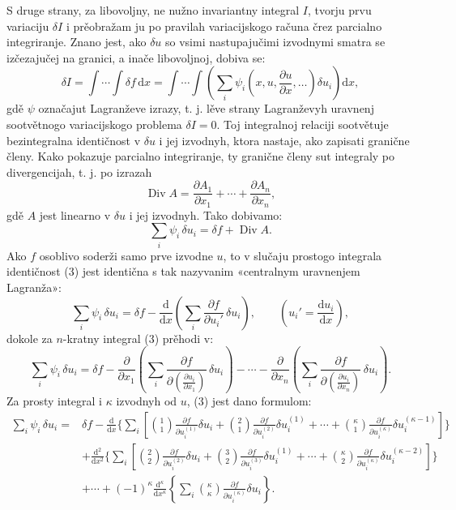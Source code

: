 \documentclass[11pt]{article}
\providecommand{\p}{\partial}
\providecommand{\dd}{\mathrm d}
\DeclareMathOperator{\Div}{Div}
\begin{document}
S druge strany, za libovoljny, ne nužno invariantny integral \(I\), tvorju prvu variaciju \(\delta I\) i prěobražam ju po pravilah variacijskogo računa črez parcialno integriranje. Znano jest, ako \(\delta u\) so vsimi nastupajučimi izvodnymi smatra se izčezajučej na granici, a inače libovoljnoj, dobiva se:
\begin{equation}
\delta I=\int\!\cdots\!\int \delta f\,\dd x
=\int\!\cdots\!\int\left(\sum_i\psi_i\!\left(x,u,\frac{\p u}{\p x},\ldots\right)\delta u_i\right)\dd x,
\tag{2}
\end{equation}
gdě \(\psi\) označajut Lagranževe izrazy, t. j. lěve strany Lagranževyh uravnenj sootvětnogo variacijskogo problema \(\delta I=0\). Toj integralnoj relaciji sootvětuje bezintegralna identičnost v \(\delta u\) i jej izvodnyh, ktora nastaje, ako zapisati granične členy. Kako pokazuje parcialno integriranje, ty granične členy sut integraly po divergencijah, t. j. po izrazah
\[
\Div A=\frac{\p A_1}{\p x_1}+\cdots+\frac{\p A_n}{\p x_n},
\]
gdě \(A\) jest linearno v \(\delta u\) i jej izvodnyh. Tako dobivamo:
\begin{equation}
\sum_i\psi_i\,\delta u_i=\delta f+\Div A.
\tag{3}
\end{equation}
Ako \(f\) osoblivo soderži samo prve izvodne \(u\), to v slučaju prostogo integrala identičnost (3) jest identična s tak nazyvanim «centralnym uravnenjem Lagranža»:
\begin{equation}
\sum_i \psi_i\,\delta u_i
=\delta f-\frac{\dd}{\dd x}\left(\sum_i\frac{\p f}{\p u_i'}\,\delta u_i\right),
\qquad \left(u_i'=\frac{\dd u_i}{\dd x}\right),
\tag{4}
\end{equation}
dokole za \(n\)-kratny integral (3) prěhodi v:
\begin{equation}
\sum_i\psi_i\,\delta u_i
=
\delta f
-\frac{\p}{\p x_1}\left(\sum_i\frac{\p f}{\p \left(\frac{\p u_i}{\p x_1}\right)}\,\delta u_i\right)
-\cdots
-\frac{\p}{\p x_n}\left(\sum_i\frac{\p f}{\p \left(\frac{\p u_i}{\p x_n}\right)}\,\delta u_i\right).
\tag{5}
\end{equation}
Za prosty integral i \(\kappa\) izvodnyh od \(u\), (3) jest dano formulom:
\begin{equation}
\begin{aligned}
\sum_i\psi_i\,\delta u_i
={}&\delta f
-\frac{\dd}{\dd x}\Bigg\{\sum_i\left[
\binom{1}{1}\frac{\p f}{\p u_i^{(1)}}\delta u_i
+\binom{2}{1}\frac{\p f}{\p u_i^{(2)}}\delta u_i^{(1)}
+\cdots+
\binom{\kappa}{1}\frac{\p f}{\p u_i^{(\kappa)}}\delta u_i^{(\kappa-1)}
\right]\Bigg\}\\
&+\frac{\dd^2}{\dd x^2}\Bigg\{\sum_i\left[
\binom{2}{2}\frac{\p f}{\p u_i^{(2)}}\delta u_i
+\binom{3}{2}\frac{\p f}{\p u_i^{(3)}}\delta u_i^{(1)}
+\cdots+
\binom{\kappa}{2}\frac{\p f}{\p u_i^{(\kappa)}}\delta u_i^{(\kappa-2)}
\right]\Bigg\}\\
&+\cdots
+(-1)^\kappa\frac{\dd^\kappa}{\dd x^\kappa}
\left\{\sum_i\binom{\kappa}{\kappa}
\frac{\p f}{\p u_i^{(\kappa)}}\delta u_i\right\}.
\end{aligned}
\tag{6}
\end{equation}
\end{document}
